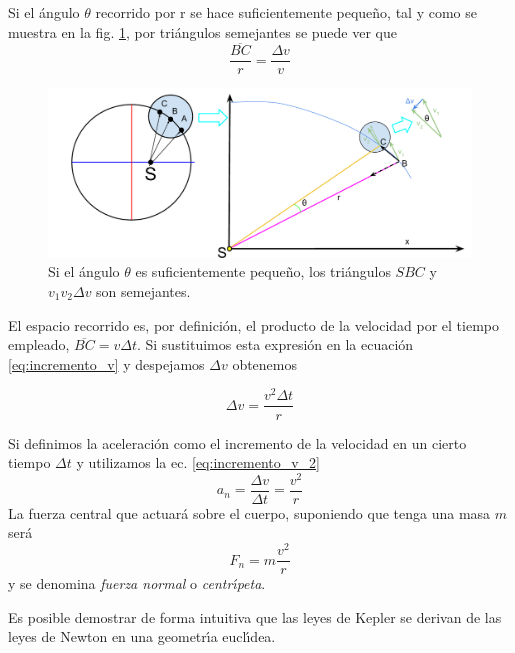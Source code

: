 Si el \'angulo $\theta$ recorrido por r se hace suficientemente peque\~{n}o, tal y como se muestra en la fig. \ref{fig:fuerzaCentripeta}, por tri\'angulos semejantes se puede ver que
\begin{equation}
\frac{\overline{BC}}{r}=\frac{\Delta v}{v}
\label{eq:incremento_v}
\end{equation}

\begin{figure}[h]
  \includegraphics[width=\linewidth]{FuerzaCentripeta.pdf}
  \caption{Si el \'angulo $\theta$ es suficientemente peque\~{n}o, los tri\'angulos $SBC$ y $v_{1}v_{2}\Delta v$ son semejantes.}
  \label{fig:fuerzaCentripeta}
\end{figure}
El espacio recorrido es, por definici\'on, el producto de la velocidad por el tiempo empleado, $\overline{BC}=v\Delta t$. Si sustituimos esta expresi\'on en la ecuaci\'on \ref{eq:incremento_v} y despejamos $\Delta v$ obtenemos

\begin{equation}
\Delta v=\frac{v^{2}\Delta t}{r}
\label{eq:incremento_v_2}
\end{equation}

Si definimos la aceleraci\'on como el incremento de la velocidad  en un cierto tiempo $\Delta t$ y utilizamos la ec. \ref{eq:incremento_v_2}
\begin{equation}
a_{n}=\frac{\Delta v}{\Delta t}=\frac{v^{2}}{r}
\label{eq:aceleracion_n2}
\end{equation}
La fuerza central que actuar\'a sobre el cuerpo, suponiendo que tenga una masa $m$ ser\'a
\begin{equation}
F_{n}=m\frac{v^{2}}{r}
\label{eq:fuerza_centripeta}
\end{equation}
y se denomina \emph{fuerza normal} o \emph{centr\'\i{}peta}.


Es posible demostrar de forma intuitiva que las leyes de Kepler se derivan de las leyes de Newton en una geometr\'\i{}a eucl\'\i{}dea\cite{Goodstein1996}\cite{Beckman2006}\cite{ANU:7701776}.


